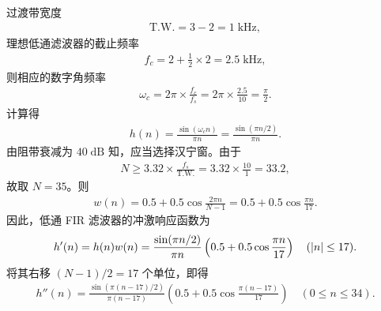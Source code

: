 \begin{solution}
    过渡带宽度
    \begin{align*}
        \text{T.W.} = 3 - 2 = 1\;\mathrm{kHz},
    \end{align*}
    理想低通滤波器的截止频率
    \begin{align*}
        f_c = 2 + \frac{1}{2} \times 2 = 2.5\;\mathrm{kHz},
    \end{align*}
    则相应的数字角频率
    \begin{align*}
        \omega_c = 2\pi \times \frac{f_c}{f_s} = 2\pi \times \frac{2.5}{10} = \frac{\pi}{2}.
    \end{align*}
    计算得
    \begin{align*}
        h(n) = \frac{\sin(\omega_c n)}{\pi n} = \frac{\sin(\pi n / 2)}{\pi n}.
    \end{align*}
    由阻带衰减为 $40\;\mathrm{dB}$ 知，应当选择汉宁窗。由于
    \begin{align*}
        N \ge 3.32 \times \frac{f_s}{\text{T.W.}} = 3.32 \times \frac{10}{1} = 33.2,
    \end{align*}
    故取 $N = 35$。则
    \begin{align*}
        w(n) = 0.5 + 0.5\cos\frac{2\pi n}{N - 1} = 0.5 + 0.5\cos\frac{\pi n}{17}.
    \end{align*}
    因此，低通 FIR 滤波器的冲激响应函数为
    \begin{align*}
        h'(n) = h(n) w(n) = \frac{\sin(\pi n / 2)}{\pi n} \left(0.5 + 0.5\cos\frac{\pi n}{17}\right) \quad (\left|n\right| \le 17).
    \end{align*}
    将其右移 $(N - 1) / 2 = 17$ 个单位，即得
    \begin{align*}
        h''(n) = \frac{\sin(\pi (n - 17) / 2)}{\pi (n - 17)} \left(0.5 + 0.5\cos\frac{\pi (n - 17)}{17}\right) \quad (0 \le n \le 34).
    \end{align*}
\end{solution}

